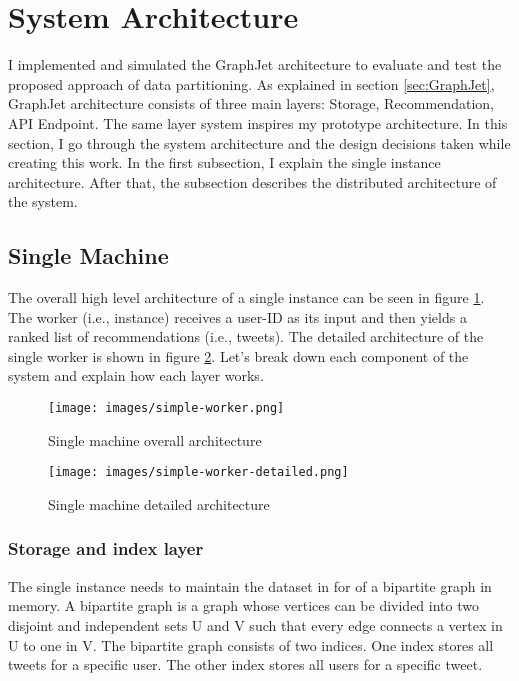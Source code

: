 \section{System Architecture}
\label{System Architecture}

I implemented and simulated the GraphJet architecture to evaluate and test the proposed approach of data partitioning. As explained in section \ref{sec:GraphJet}, GraphJet architecture consists of three main layers: Storage, Recommendation, API Endpoint. The same layer system inspires my prototype architecture. In this section, I go through the system architecture and the design decisions taken while creating this work. In the first subsection, I explain the single instance architecture. After that, the subsection describes the distributed architecture of the system. 


\subsection{Single Machine}
\label{subsec:single-machine}
The overall high level architecture of a single instance can be seen in figure \ref{fig:single-machine-architecture}. The worker (i.e., instance) receives a user-ID as its input and then yields a ranked list of recommendations (i.e., tweets). The detailed architecture of the single worker is shown in figure \ref{fig:single-machine-architecture-detailed}. Let's break down each component of the system and explain how each layer works.

\begin{figure}[!ht]
	\centering
	\texttt{[image: images/simple-worker.png]}
	\caption{Single machine overall architecture}
	\label{fig:single-machine-architecture}
\end{figure}

\begin{figure}[!h]
	\centering
	\texttt{[image: images/simple-worker-detailed.png]}
	\caption{Single machine detailed architecture}
	\label{fig:single-machine-architecture-detailed}
\end{figure}

\subsubsection{Storage and index layer}
\label{subsub:storage-index-layer}
The single instance needs to maintain the dataset in for of a bipartite graph in memory. A bipartite graph is a graph whose vertices can be divided into two disjoint and independent sets U and V such that every edge connects a vertex in U to one in V. The bipartite graph consists of two indices. One index stores all tweets for a specific user. The other index stores all users for a specific tweet.

